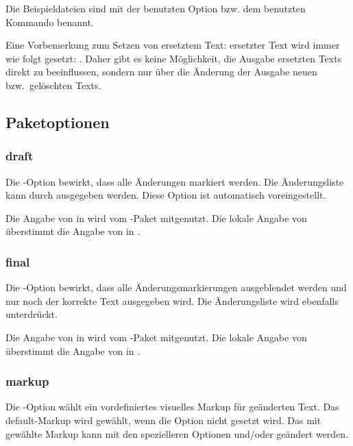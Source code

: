 

Die Beispieldateien sind mit der benutzten Option bzw. dem benutzten Kommando benannt.

Eine Vorbemerkung zum Setzen von ersetztem Text: ersetzter Text wird immer wie folgt gesetzt: .
Daher gibt es keine Möglichkeit, die Ausgabe ersetzten Texts direkt zu beeinflussen, sondern nur über die Änderung der Ausgabe neuen bzw.\ gelöschten Texts.

\subsection{Paketoptionen}
\label{sec:user:options}

\subsubsection{draft}

Die -Option bewirkt, dass alle Änderungen markiert werden.
Die Änderungsliste kann durch  ausgegeben werden.
Diese Option ist automatisch voreingestellt.

Die Angabe von  in  wird vom -Paket mitgenutzt.
Die lokale Angabe von  überstimmt die Angabe von  in .



\subsubsection{final}

Die -Option bewirkt, dass alle Änderungsmarkierungen ausgeblendet werden und nur noch der korrekte Text ausgegeben wird.
Die Änderungsliste wird ebenfalls unterdrückt.

Die Angabe von  in  wird vom -Paket mitgenutzt.
Die lokale Angabe von  überstimmt die Angabe von  in .



\subsubsection{markup}

Die -Option wählt ein vordefiniertes visuelles Markup für geänderten Text.
Das default-Markup wird gewählt, wenn die Option nicht gesetzt wird.
Das mit  gewählte Markup kann mit den spezielleren Optionen  und/oder  geändert werden.

